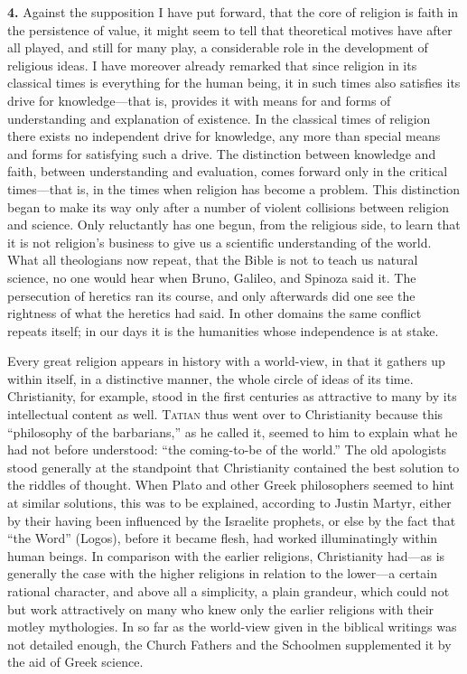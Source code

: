 \documentclass[12pt,a4paper]{book}
\newcommand{\opage}[1]{\marginnote{\footnotesize\textit{[#1]}}}
\begin{document}
\noindent\textbf{4.} Against the supposition I have put forward, that
the core of religion is faith in the persistence of value, it might seem
to tell that theoretical motives have after all played, and still for
many play, a considerable role in the development of religious ideas. I
have moreover already remarked that since religion in its classical
times is everything for the human being, it in such times also satisfies
its drive for knowledge---that is, provides it with means for and forms
of understanding and explanation of existence. In the classical times of
religion there exists no independent drive for knowledge, any more than
special means and forms for satisfying such a drive. The distinction
between knowledge and faith, between understanding and evaluation, comes
forward only in the critical times---that is, in the times when religion
has become a problem. This distinction began to make its way only after
a number of violent collisions between religion and science. Only
reluctantly has one begun, from the religious side, to learn that it is
not religion's business to give us a scientific understanding of the
world. What all theologians now repeat, that the Bible is not to teach
us natural science, no one would hear when Bruno, Galileo, and Spinoza
said it. The persecution of heretics ran its course, and only afterwards
did one see the rightness of what the heretics had said. In other
domains the same conflict repeats itself; in our days it is the
humanities whose independence is at stake.

Every great religion appears in history with a world-view, in that it
gathers up within itself, in a distinctive manner, the whole circle of
ideas of its time. Christianity, for example, stood in the first
centuries as attractive to many by its intellectual content as well.
\textsc{Tatian} thus went over to Christianity because this ``philosophy
of the barbarians,'' as he called it, seemed to him to explain what he
had not before understood: ``the coming-to-be of the world.'' 
\opage{16}The old
apologists stood generally at the standpoint that Christianity contained
the best solution to the riddles of thought. When Plato and other Greek
philosophers seemed to hint at similar solutions, this was to be
explained, according to Justin Martyr, either by their having been
influenced by the Israelite prophets, or else by the fact that ``the
Word'' (Logos), before it became flesh, had worked illuminatingly within
human beings. In comparison with the earlier religions, Christianity
had---as is generally the case with the higher religions in relation to
the lower---a certain rational character, and above all a simplicity, a
plain grandeur, which could not but work attractively on many who knew
only the earlier religions with their motley mythologies. In so far as
the world-view given in the biblical writings was not detailed enough,
the Church Fathers and the Schoolmen supplemented it by the aid of Greek
science.
\end{document}
